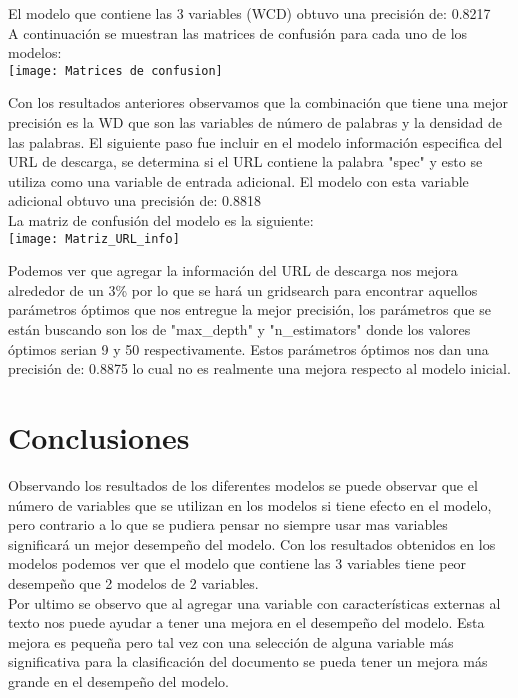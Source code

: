 \documentclass{article}
\begin{document}
	El modelo que contiene las 3 variables (WCD) obtuvo una precisión de: 0.8217\\
	
	A continuación se muestran las matrices de confusión para cada uno de los modelos:\\
	
	\texttt{[image: Matrices de confusion]}
	
	Con los resultados anteriores observamos que la combinación que tiene una mejor precisión es la WD que son las variables de número de palabras y la densidad de las palabras. El siguiente paso fue incluir en el modelo información especifica del URL de descarga, se determina si el URL contiene la palabra "spec" y esto se utiliza como una variable de entrada adicional. El modelo con esta variable adicional obtuvo una precisión de: 0.8818\\
	
	La matriz de confusión del modelo es la siguiente:\\
	
	\texttt{[image: Matriz\_URL\_info]}
	
	Podemos ver que agregar la información del URL de descarga nos mejora alrededor de un 3\% por lo que se hará un gridsearch para encontrar aquellos parámetros óptimos que nos entregue la mejor precisión, los parámetros que se están buscando son los de "max\_depth" y "n\_estimators" donde los valores óptimos serian 9 y 50 respectivamente. Estos parámetros óptimos nos dan una precisión de: 0.8875 lo cual no es realmente una mejora respecto al modelo inicial.
	
	\section*{Conclusiones}
	
	Observando los resultados de los diferentes modelos se puede observar que el número de variables que se utilizan en los modelos si tiene efecto en el modelo, pero contrario a lo que se pudiera pensar no siempre usar mas variables significará un mejor desempeño del modelo. Con los resultados obtenidos en los modelos podemos ver que el modelo que contiene las 3 variables tiene peor desempeño que 2 modelos de 2 variables.\\
	
	Por ultimo se observo que al agregar una variable con características externas al texto nos puede ayudar a tener una mejora en el desempeño del modelo. Esta mejora es pequeña pero tal vez con una selección de alguna variable más significativa para la clasificación del documento se pueda tener un mejora más grande en el desempeño del modelo.  
	
		
\end{document}
